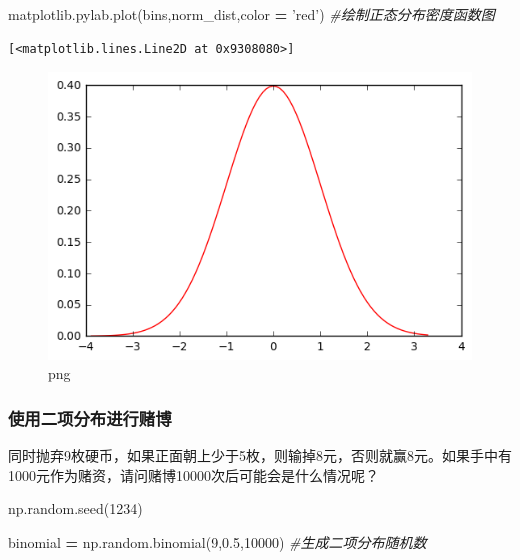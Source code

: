 \documentclass[]{article}
\newenvironment{Shaded}{\begin{snugshade}}{\end{snugshade}}
\newcommand{\DecValTok}[1]{\textcolor[rgb]{0.00,0.00,0.81}{#1}}
\newcommand{\FloatTok}[1]{\textcolor[rgb]{0.00,0.00,0.81}{#1}}
\newcommand{\StringTok}[1]{\textcolor[rgb]{0.31,0.60,0.02}{#1}}
\newcommand{\CommentTok}[1]{\textcolor[rgb]{0.56,0.35,0.01}{\textit{#1}}}
\newcommand{\OperatorTok}[1]{\textcolor[rgb]{0.81,0.36,0.00}{\textbf{#1}}}
\newcommand{\NormalTok}[1]{#1}
\begin{document}
\begin{Shaded}
\begin{Highlighting}[]
\NormalTok{matplotlib.pylab.plot(bins,norm_dist,color }\OperatorTok{=} \StringTok{'red'}\NormalTok{) }\CommentTok{#绘制正态分布密度函数图}
\end{Highlighting}
\end{Shaded}

\begin{verbatim}
[<matplotlib.lines.Line2D at 0x9308080>]
\end{verbatim}

\begin{figure}
\centering
\includegraphics{output_199_1.png}
\caption{png}
\end{figure}

\subsubsection{使用二项分布进行赌博}

同时抛弃9枚硬币，如果正面朝上少于5枚，则输掉8元，否则就赢8元。如果手中有1000元作为赌资，请问赌博10000次后可能会是什么情况呢？

\begin{Shaded}
\begin{Highlighting}[]
\NormalTok{np.random.seed(}\DecValTok{1234}\NormalTok{)}
\end{Highlighting}
\end{Shaded}

\begin{Shaded}
\begin{Highlighting}[]
\NormalTok{binomial }\OperatorTok{=}\NormalTok{ np.random.binomial(}\DecValTok{9}\NormalTok{,}\FloatTok{0.5}\NormalTok{,}\DecValTok{10000}\NormalTok{) }\CommentTok{#生成二项分布随机数}
\end{Highlighting}
\end{Shaded}
\end{document}
